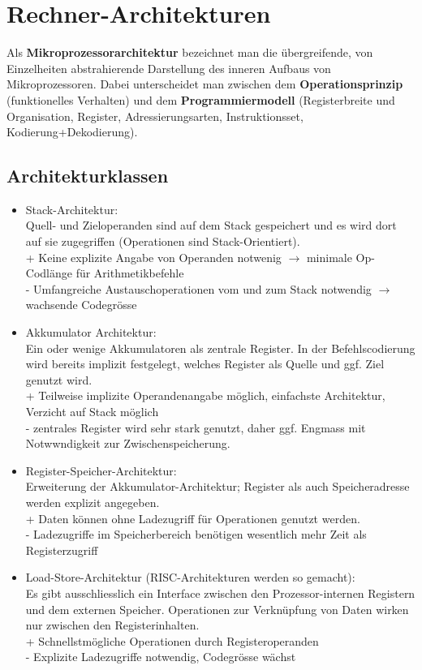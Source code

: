 \section{Rechner-Architekturen}
Als \textbf{Mikroprozessorarchitektur} bezeichnet man die übergreifende, von Einzelheiten abstrahierende Darstellung des inneren Aufbaus von Mikroprozessoren.
Dabei unterscheidet man zwischen dem \textbf{Operationsprinzip} (funktionelles Verhalten) und dem \textbf{Programmiermodell} (Registerbreite und Organisation, Register, Adressierungsarten, Instruktionsset, Kodierung+Dekodierung).

\subsection{Architekturklassen}
\begin{itemize}[noitemsep,topsep=0pt]
	\item Stack-Architektur:\\
	Quell- und Zieloperanden sind auf dem Stack gespeichert und es wird dort auf sie zugegriffen (Operationen sind Stack-Orientiert).\\
	+ Keine explizite Angabe von Operanden notwenig $\rightarrow$ minimale Op-Codlänge für Arithmetikbefehle\\
	- Umfangreiche Austauschoperationen vom und zum Stack notwendig $\rightarrow$ wachsende Codegrösse
	
	\item Akkumulator Architektur:\\
	Ein oder wenige Akkumulatoren als zentrale Register. In der Befehlscodierung wird bereits implizit festgelegt, welches Register als Quelle und ggf. Ziel genutzt wird.\\
	+ Teilweise implizite Operandenangabe möglich, einfachste Architektur, Verzicht auf Stack möglich\\
	- zentrales Register wird sehr stark genutzt, daher ggf. Engmass mit Notwwndigkeit zur Zwischenspeicherung.
	
	\item Register-Speicher-Architektur:\\
	Erweiterung der Akkumulator-Architektur; Register als auch Speicheradresse werden explizit angegeben.\\
	+ Daten können ohne Ladezugriff für Operationen genutzt werden.\\
	- Ladezugriffe im Speicherbereich benötigen wesentlich mehr Zeit als Registerzugriff
	
	\item Load-Store-Architektur (RISC-Architekturen werden so gemacht):\\
	Es gibt ausschliesslich ein Interface zwischen den Prozessor-internen Registern und dem externen Speicher. Operationen zur Verknüpfung von Daten wirken nur zwischen den Registerinhalten.\\
	+ Schnellstmögliche Operationen durch Registeroperanden\\
	- Explizite Ladezugriffe notwendig, Codegrösse wächst
\end{itemize}

